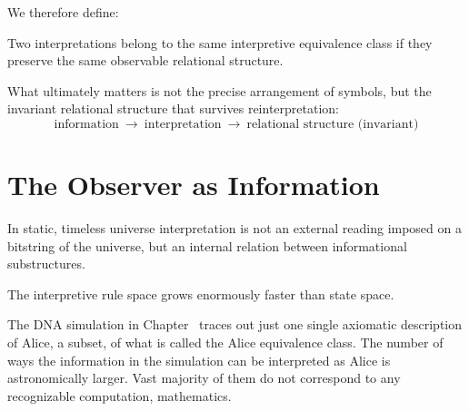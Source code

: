 We therefore define:

\begin{tcolorbox}[title=Interpretive Equivalence Class]
Two interpretations belong to the same interpretive equivalence class if they preserve the same observable relational structure.
\end{tcolorbox}

What ultimately matters is not the precise arrangement of symbols, but the invariant relational structure that survives reinterpretation:
\[
\text{information} \ \longrightarrow \ \text{interpretation} \ \longrightarrow \ \text{relational structure (invariant)}
\]



\section{The Observer as Information}

In static, timeless universe interpretation is not an external reading imposed on a bitstring of the universe, but
an internal relation between informational substructures.

The interpretive rule space grows enormously faster than state space. 

The DNA simulation in Chapter~ traces out just one single axiomatic description of Alice, a subset, of what is called the Alice equivalence class. 
The number of ways the information in the simulation can be interpreted as Alice is astronomically larger. Vast majority of them do not correspond to any recognizable computation, 
mathematics.


